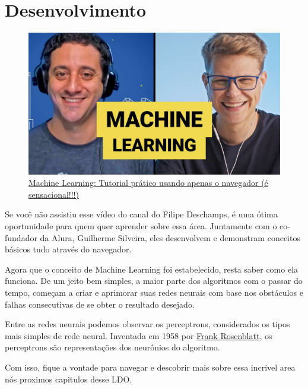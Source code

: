 \documentclass{article}
\begin{document}
    \newpage
    \section{Desenvolvimento} \label{sec:desenvolvimento}

    \begin{figure}[htp]
        \centering
        \includegraphics[scale=0.3]{maxresdefault.jpg}
        \caption{\href{https://youtu.be/pbVwH8o837Ahttps://www.youtube.com/watch?v=JyGGMyR3x5I}{Machine Learning: Tutorial prático usando apenas o navegador (é sensacional!!!)}}
    \end{figure}

    Se você não assistiu esse vídeo do canal do Filipe Deschamps, é uma ótima oportunidade para 
    quem quer aprender sobre essa área. Juntamente com o co-fundador da Alura, Guilherme Silveira, 
    eles desenvolvem e demonstram conceitos básicos tudo através do navegador.

    Agora que o conceito de Machine Learning foi estabelecido, resta saber como ela funciona. De 
    um jeito bem simples, a maior parte dos algoritmos com o passar do tempo, começam a criar e 
    aprimorar suas redes neurais com base nos obstáculos e falhas consecutivas de se obter o 
    resultado desejado. 
    
    Entre as redes neurais podemos observar os perceptrons, considerados os tipos mais simples de 
    rede neural. Inventada em 1958 por \href{https://en.wikipedia.org/wiki/Arthur_Samuel}{Frank Rosenblatt}, 
    os perceptrons são representações dos neurônios do algoritmo.  

    Com isso, fique a vontade para navegar e descobrir mais sobre essa incrivel area nós proximos capitulos desse
    LDO.
\end{document}

